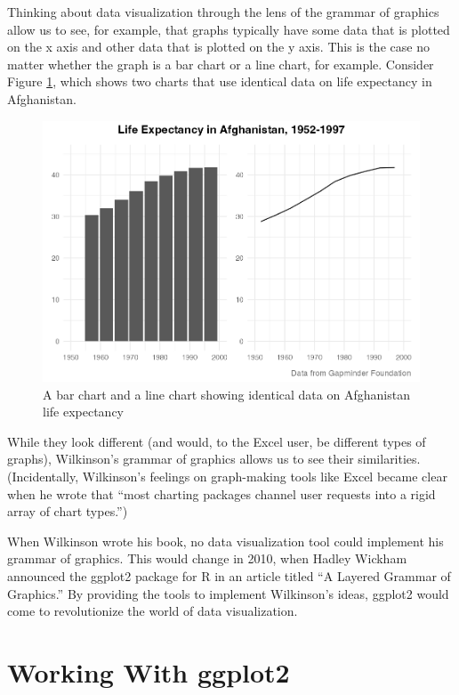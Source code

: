 \documentclass[
]{book}
\begin{document}
Thinking about data visualization through the lens of the grammar of graphics allow us to see, for example, that graphs typically have some data that is plotted on the x axis and other data that is plotted on the y axis. This is the case no matter whether the graph is a bar chart or a line chart, for example. Consider Figure \ref{fig:bar-line-chart}, which shows two charts that use identical data on life expectancy in Afghanistan.

\begin{figure}
\includegraphics[width=1\linewidth]{data-viz_files/figure-latex/bar-line-chart-1} \caption{A bar chart and a line chart showing identical data on Afghanistan life expectancy}\label{fig:bar-line-chart}
\end{figure}

While they look different (and would, to the Excel user, be different types of graphs), Wilkinson's grammar of graphics allows us to see their similarities. (Incidentally, Wilkinson's feelings on graph-making tools like Excel became clear when he wrote that ``most charting packages channel user requests into a rigid array of chart types.'')

When Wilkinson wrote his book, no data visualization tool could implement his grammar of graphics. This would change in 2010, when Hadley Wickham announced the ggplot2 package for R in an article titled ``A Layered Grammar of Graphics.'' By providing the tools to implement Wilkinson's ideas, ggplot2 would come to revolutionize the world of data visualization.

\hypertarget{working-with-ggplot2}{%
\section*{Working With ggplot2}\label{working-with-ggplot2}}
\end{document}
